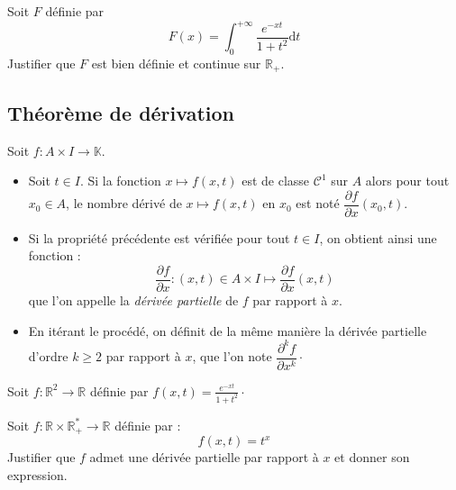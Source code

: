 \documentclass[french,11pt,twoside]{VcCours}
\newcommand{\dt}{\text{d}t}
\begin{document}
\begin{ApplicationDirecte}{} Soit $F$ définie par 
$$ F(x) = \int_{0}^{+ \infty} \frac{e^{-xt}}{1+t^2} \dt$$
Justifier que $F$ est bien définie et continue sur $\mathbb{R}_+$.
\end{ApplicationDirecte} 

\subsection{Théorème de dérivation}

\begin{Definition}{} Soit $f : A \times I \rightarrow \mathbb{K}$.

\begin{itemize}
\item Soit $t \in I$. Si la fonction $x \mapsto f(x,t)$ est de classe $\mathcal{C}^1$ sur $A$ alors pour tout $x_0 \in A$, le nombre dérivé de $x \mapsto f(x,t)$ en $x_0$ est noté $\dfrac{\partial f}{\partial x} (x_0,t)$.
\item Si la propriété précédente est vérifiée pour tout $t \in I$, on obtient ainsi une fonction :
$$ \dfrac{\partial f}{\partial x} : (x,t) \in A \times I \mapsto \dfrac{\partial f}{\partial x}(x,t)$$
que l'on appelle la \emph{dérivée partielle} de $f$ par rapport à $x$.
\item En itérant le procédé, on définit de la même manière la dérivée partielle d'ordre $k \geq 2$ par rapport à $x$, que l'on note $\dfrac{\partial^k f}{\partial x^k} \cdot$
\end{itemize}
\end{Definition}

\medskip

\begin{Exemple} Soit $f : \mathbb{R}^2 \rightarrow \mathbb{R}$ définie par $f(x,t) = \frac{e^{-xt}}{1+t^2}\cdot$

\vspace{4cm}
\end{Exemple}

\begin{ApplicationDirecte}{} Soit $f : \mathbb{R} \times \mathbb{R}_+^{*} \rightarrow \mathbb{R}$ définie par :
$$ f(x,t) = t^x$$
Justifier que $f$ admet une dérivée partielle par rapport à $x$ et donner son expression. 
\end{ApplicationDirecte}
\end{document}
